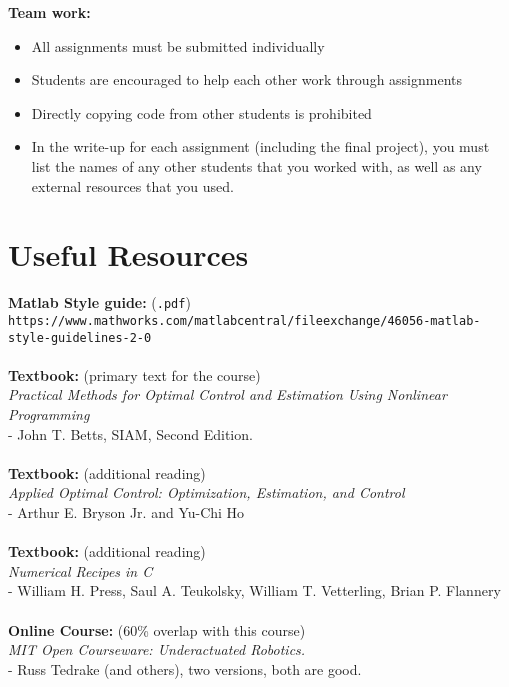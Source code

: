 \documentclass[onecolumn]{article}
\begin{document}
\textbf{Team work:}
\vspace{-0.6em} \begin{itemize}  \setlength\itemsep{-0.4em}
  \item All assignments must be submitted individually
  \item Students are encouraged to help each other work through assignments
  \item Directly copying code from other students is prohibited
  \item In the write-up for each assignment (including the final project),
        you must list the names of any other students that you worked with,
        as well as any external resources that you used.
\end{itemize}

\section*{Useful Resources}

\textbf{Matlab Style guide:} (\texttt{.pdf}) \\
\small{\texttt{https://www.mathworks.com/matlabcentral/fileexchange/46056-matlab-style-guidelines-2-0}}\\
\\
\textbf{Textbook:} (primary text for the course) \\
\textit{Practical Methods for Optimal Control and Estimation Using Nonlinear Programming} \\
- John T. Betts,  SIAM,  Second Edition. \\
\\
\textbf{Textbook:} (additional reading) \\
\textit{Applied Optimal Control: Optimization, Estimation, and Control} \\
- Arthur E. Bryson Jr. and Yu-Chi Ho \\
\\
\textbf{Textbook:} (additional reading) \\
\textit{Numerical Recipes in C} \\
- William H. Press,  Saul A. Teukolsky,  William T. Vetterling,  Brian P. Flannery \\
\\
\textbf{Online Course:} (60\% overlap with this course)\\
\textit{MIT Open Courseware:  Underactuated Robotics.}\\
- Russ Tedrake (and others), two versions, both are good.\\
\\
\\
\end{document}
